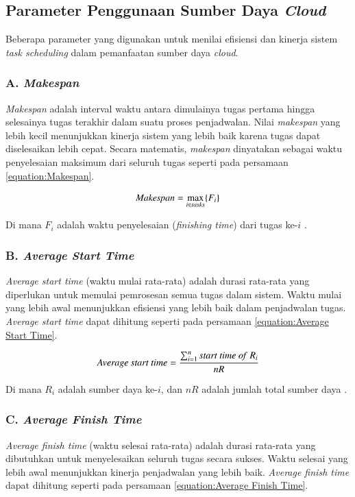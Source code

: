 \subsection{Parameter Penggunaan Sumber Daya \textit{Cloud}}
Beberapa parameter yang digunakan untuk menilai efisiensi dan kinerja sistem \textit{task scheduling} dalam pemanfaatan sumber daya \textit{cloud}.
\subsubsection{A. \textit{Makespan}}
\textit{Makespan} adalah interval waktu antara dimulainya tugas pertama hingga selesainya tugas terakhir dalam suatu proses penjadwalan. Nilai \textit{makespan} yang lebih kecil menunjukkan kinerja sistem yang lebih baik karena tugas dapat diselesaikan lebih cepat. Secara matematis, \textit{makespan} dinyatakan sebagai waktu penyelesaian maksimum dari seluruh tugas seperti pada persamaan \ref{equation:Makespan}.

\begin{equation}
\label{equation:Makespan}
    \text{\textit{Makespan}} = \max_{i \in \text{\textit{tasks}}} \{F_i\}
\end{equation}

Di mana $F_i$ adalah waktu penyelesaian (\textit{finishing time}) dari tugas ke-$i$ \parencite{Ciptaningtyas2024}.

\subsubsection{B. \textit{Average Start Time}}
\textit{Average start time} (waktu mulai rata-rata) adalah durasi rata-rata yang diperlukan untuk memulai pemrosesan semua tugas dalam sistem. Waktu mulai yang lebih awal menunjukkan efisiensi yang lebih baik dalam penjadwalan tugas. \textit{Average start time} dapat dihitung seperti pada persamaan \ref{equation:Average Start Time}.

\begin{equation}
\label{equation:Average Start Time}
    \text{\textit{Average start time}} = \frac{\sum_{i=1}^{n} \text{\textit{start time of} } R_i}{nR}
\end{equation}

Di mana $R_i$ adalah sumber daya ke-$i$, dan $nR$ adalah jumlah total sumber daya \parencite{Ciptaningtyas2024}.

\subsubsection{C. \textit{Average Finish Time}}
\textit{Average finish time} (waktu selesai rata-rata) adalah durasi rata-rata yang dibutuhkan untuk menyelesaikan seluruh tugas secara sukses. Waktu selesai yang lebih awal menunjukkan kinerja penjadwalan yang lebih baik. \textit{Average finish time} dapat dihitung seperti pada persamaan \ref{equation:Average Finish Time}.

